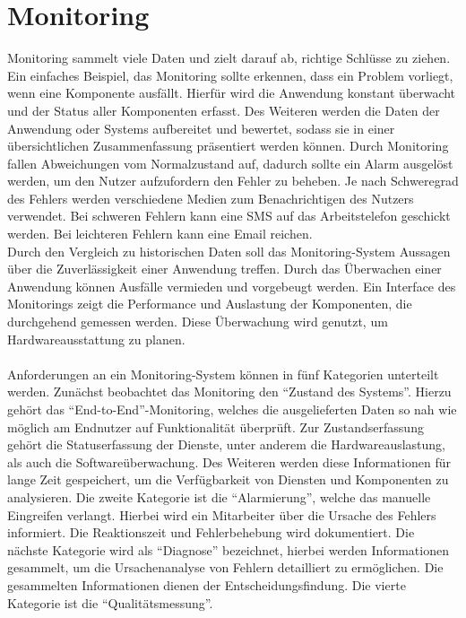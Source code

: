 \section{Monitoring}\label{sec:monitoring}
Monitoring sammelt viele Daten und zielt darauf ab, richtige Schlüsse zu ziehen.
Ein einfaches Beispiel, das Monitoring sollte erkennen, dass ein Problem vorliegt, wenn eine Komponente ausfällt.
Hierfür wird die Anwendung konstant überwacht und der Status aller Komponenten erfasst.
Des Weiteren werden die Daten der Anwendung oder Systems aufbereitet und bewertet, sodass sie in einer übersichtlichen Zusammenfassung präsentiert werden können.
Durch Monitoring fallen Abweichungen vom Normalzustand auf, dadurch sollte ein Alarm ausgelöst werden, um den Nutzer aufzufordern den Fehler zu beheben.
Je nach Schweregrad des Fehlers werden verschiedene Medien zum Benachrichtigen des Nutzers verwendet.
Bei schweren Fehlern kann eine SMS auf das Arbeitstelefon geschickt werden.
Bei leichteren Fehlern kann eine Email reichen.
\\
Durch den Vergleich zu historischen Daten soll das Monitoring-System Aussagen über die Zuverlässigkeit einer Anwendung treffen.
Durch das Überwachen einer Anwendung können Ausfälle vermieden und vorgebeugt werden.
Ein Interface des Monitorings zeigt die Performance und Auslastung der Komponenten, die durchgehend gemessen werden.
Diese Überwachung wird genutzt, um Hardwareausstattung zu planen.
\\
\\
Anforderungen an ein Monitoring-System können in fünf Kategorien unterteilt werden.
Zunächst beobachtet das Monitoring den \enquote{Zustand des Systems}.
Hierzu gehört das \enquote{End-to-End}-Monitoring, welches die ausgelieferten Daten so nah wie möglich am Endnutzer auf Funktionalität überprüft.
Zur Zustandserfassung gehört die Statuserfassung der Dienste, unter anderem die Hardwareauslastung, als auch die Softwareüberwachung.
Des Weiteren werden diese Informationen für lange Zeit gespeichert, um die Verfügbarkeit von Diensten und Komponenten zu analysieren.
Die zweite Kategorie ist die \enquote{Alarmierung}, welche das manuelle Eingreifen verlangt.
Hierbei wird ein Mitarbeiter über die Ursache des Fehlers informiert.
Die Reaktionszeit und Fehlerbehebung wird dokumentiert.
Die nächste Kategorie wird als \enquote{Diagnose} bezeichnet, hierbei werden Informationen gesammelt, um die Ursachenanalyse von Fehlern detailliert zu ermöglichen.
Die gesammelten Informationen dienen der Entscheidungsfindung.
Die vierte Kategorie ist die \enquote{Qualitätsmessung}.
